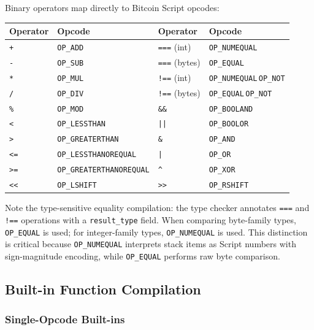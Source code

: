 \documentclass[11pt,a4paper]{article}
\newcommand{\op}[1]{\texttt{OP\_#1}}
\begin{document}
Binary operators map directly to Bitcoin Script opcodes:

\begin{center}
\small
\begin{tabular}{@{}ll@{\qquad}ll@{}}
\toprule
\textbf{Operator} & \textbf{Opcode} & \textbf{Operator} & \textbf{Opcode} \\
\midrule
\texttt{+} & \op{ADD} & \texttt{===} (int) & \op{NUMEQUAL} \\
\texttt{-} & \op{SUB} & \texttt{===} (bytes) & \op{EQUAL} \\
\texttt{*} & \op{MUL} & \texttt{!==} (int) & \op{NUMEQUAL}\,\op{NOT} \\
\texttt{/} & \op{DIV} & \texttt{!==} (bytes) & \op{EQUAL}\,\op{NOT} \\
\texttt{\%} & \op{MOD} & \texttt{\&\&} & \op{BOOLAND} \\
\texttt{<} & \op{LESSTHAN} & \texttt{||} & \op{BOOLOR} \\
\texttt{>} & \op{GREATERTHAN} & \texttt{\&} & \op{AND} \\
\texttt{<=} & \op{LESSTHANOREQUAL} & \texttt{|} & \op{OR} \\
\texttt{>=} & \op{GREATERTHANOREQUAL} & \texttt{\^{}} & \op{XOR} \\
\texttt{<<} & \op{LSHIFT} & \texttt{>>} & \op{RSHIFT} \\
\bottomrule
\end{tabular}
\end{center}

Note the type-sensitive equality compilation: the type checker annotates
\texttt{===} and \texttt{!==} operations with a \texttt{result\_type} field.
When comparing byte-family types, \op{EQUAL} is used; for integer-family
types, \op{NUMEQUAL} is used. This distinction is critical because
\op{NUMEQUAL} interprets stack items as Script numbers with sign-magnitude
encoding, while \op{EQUAL} performs raw byte comparison.

\subsection{Built-in Function Compilation}
\label{sec:codegen-builtins}

\subsubsection{Single-Opcode Built-ins}
\end{document}
